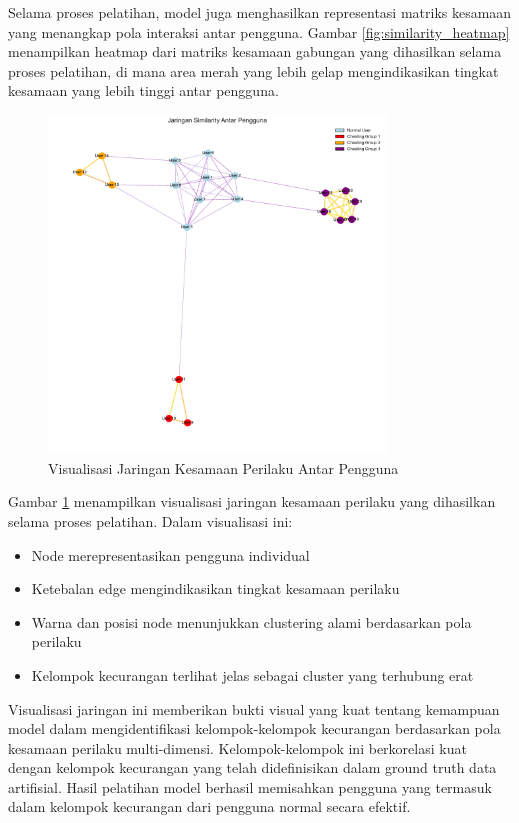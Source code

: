 Selama proses pelatihan, model juga menghasilkan representasi matriks kesamaan yang menangkap pola interaksi antar pengguna. Gambar \ref{fig:similarity_heatmap} menampilkan heatmap dari matriks kesamaan gabungan yang dihasilkan selama proses pelatihan, di mana area merah yang lebih gelap mengindikasikan tingkat kesamaan yang lebih tinggi antar pengguna.

\begin{figure}[htbp]
    \centering
    \includegraphics[width=0.8\textwidth]{figures/similarity_network.pdf}
    \caption{Visualisasi Jaringan Kesamaan Perilaku Antar Pengguna}
    \label{fig:similarity_network}
\end{figure}

Gambar \ref{fig:similarity_network} menampilkan visualisasi jaringan kesamaan perilaku yang dihasilkan selama proses pelatihan. Dalam visualisasi ini:
\begin{itemize}
    \item Node merepresentasikan pengguna individual
    \item Ketebalan edge mengindikasikan tingkat kesamaan perilaku
    \item Warna dan posisi node menunjukkan clustering alami berdasarkan pola perilaku
    \item Kelompok kecurangan terlihat jelas sebagai cluster yang terhubung erat
\end{itemize}

Visualisasi jaringan ini memberikan bukti visual yang kuat tentang kemampuan model dalam mengidentifikasi kelompok-kelompok kecurangan berdasarkan pola kesamaan perilaku multi-dimensi. Kelompok-kelompok ini berkorelasi kuat dengan kelompok kecurangan yang telah didefinisikan dalam ground truth data artifisial. Hasil pelatihan model berhasil memisahkan pengguna yang termasuk dalam kelompok kecurangan dari pengguna normal secara efektif.

